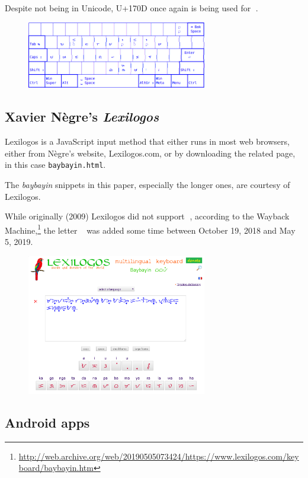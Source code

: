 \documentclass[a4paper,pagesize,openany,14pt,parskip=never]{scrbook}
\newcommand{\≈}{$\approx$}
\newcommand{\ra}{{\baybayin ᜍ}}
\begin{document}
Despite not being in Unicode, U+170D once again is being used for \ra.

\begin{figure}[H]
\includegraphics[width=0.7\textwidth]{Paninap}
\end{figure}

\newpage
\subsection{Xavier Nègre's {\em Lexilogos}}

Lexilogos is a JavaScript input method that either runs in most web browsers, either from Nègre's website, Lexilogos.com, or by downloading the related page, in this case \texttt{baybayin.html}.

The {\em baybayin} snippets in this paper, especially the longer ones, are courtesy of Lexilogos.

While originally (2009) Lexilogos did not support \ra, according to the Wayback Machine,\footnote{\url{http://web.archive.org/web/20190505073424/https://www.lexilogos.com/keyboard/baybayin.htm}} the letter \ra\ was added some time between October 19, 2018 and May 5, 2019.

\begin{figure}[H]
\includegraphics[width=0.7\textwidth]{Lexilogos}
\end{figure}

\newpage
\subsection{Android apps}
\label{Android}
\end{document}
